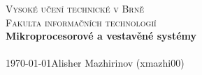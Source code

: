 \begin{titlepage}
    \begin{center}
    \Huge
    \textsc{Vysoké učení technické v Brně\\[-0.2em]
    \huge
    Fakulta informačních technologií}\\
    \Large
    \textbf{Mikroprocesorové a vestavěné systémy} \\
    \vspace{1pt}
    \Large
     \\
    \Large
    \today \hfill Alisher Mazhirinov (xmazhi00)
    \end{center}
\end{titlepage}